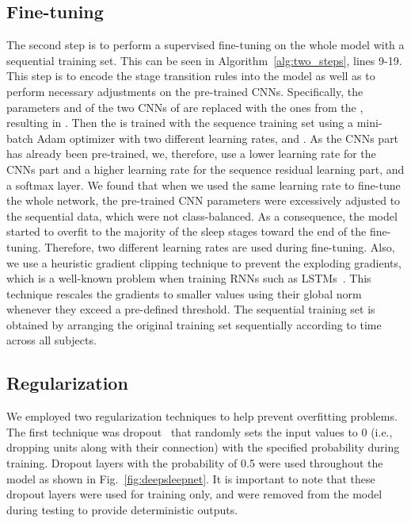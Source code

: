 \documentclass[journal,twoside]{IEEEtran}
\begin{document}
\subsection{Fine-tuning} \label{sec:two_steps_finetune}
The second step is to perform a supervised fine-tuning on the whole model with a sequential training set. This can be seen in Algorithm~\ref{alg:two_steps}, lines 9-19.  This step is to encode the stage transition rules into the model as well as to perform necessary adjustments on the pre-trained CNNs.
Specifically, the parameters  and  of the two CNNs of  are replaced with the ones from the , resulting in .
Then the  is trained with the sequence training set using a mini-batch Adam optimizer with two different learning rates,  and . As the CNNs part has already been pre-trained, we, therefore, use a lower learning rate  for the CNNs part and a higher learning rate  for the sequence residual learning part, and a softmax layer. We found that when we used the same learning rate to fine-tune the whole network, the pre-trained CNN parameters were excessively adjusted to the sequential data, which were not class-balanced. As a consequence, the model started to overfit to the majority of the sleep stages toward the end of the fine-tuning. Therefore, two different learning rates are used during fine-tuning. Also, we use a heuristic gradient clipping technique to prevent the exploding gradients, which is a well-known problem when training RNNs such as LSTMs~\cite{pascanu2012}. This technique rescales the gradients to smaller values using their global norm whenever they exceed a pre-defined threshold. The sequential training set is obtained by arranging the original training set sequentially according to time across all subjects.

\subsection{Regularization} \label{sec:regularization}
We employed two regularization techniques to help prevent overfitting problems. The first technique was dropout~\cite{srivastava2014,zaremba2014} that randomly sets the input values to 0 (i.e., dropping units along with their connection) with the specified probability during training. Dropout layers with the probability of 0.5 were used throughout the model as shown in Fig.~\ref{fig:deepsleepnet}. 
It is important to note that these dropout layers were used for training only, and were removed from the model during testing to provide deterministic outputs. 
\end{document}
